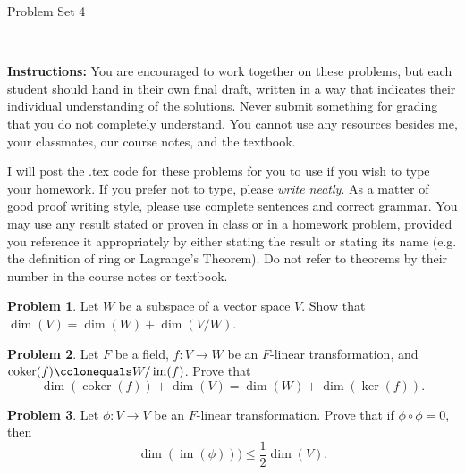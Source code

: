 \documentclass[11pt]{article}
\title{}
\date{\vspace{-0.5in}}
\DeclareMathOperator{\coker}{coker}
\DeclareMathOperator{\im}{im}
\theoremstyle{definition}
\newtheorem{problem}{Problem}
\begin{document}
\thispagestyle{fancy}
\pagestyle{fancy}

\vspace{3em}

\begin{center}
	{\LARGE Problem Set 4}
\end{center}

\

\noindent
{\bf Instructions:}
You are encouraged to work together on these problems, but each student should hand in their own final draft, written in a way that indicates their individual understanding of the solutions. Never submit something for grading that you do not completely understand. You cannot use any resources besides me, your classmates, our course notes, and the textbook.


I will post the .tex code for these problems for you to use if you wish to type your homework. If you prefer not to type, please  {\em write neatly}. As a matter of good proof writing style, please use complete sentences and correct grammar. You may use any result  stated or proven in class or in a homework problem, provided you reference it appropriately by either stating the result or stating its name (e.g. the definition of ring or Lagrange's Theorem). Do not refer to theorems by their number in the course notes or textbook.


\vspace{2em}





\begin{problem}
	Let $W$ be a subspace of a vector space $V$. Show that $\dim(V) = \dim(W) + \dim(V/W)$.
\end{problem}





\begin{problem} 
Let $F$ be a field, $f\!: V \to W$ be an $F$-linear transformation, and $\coker(f) \colonequals W/\im(f)$. Prove that
$$\dim(\coker(f)) + \dim(V) = \dim(W) + \dim(\ker(f)).$$
\end{problem}



\begin{problem}
Let $\phi: V \to V$ be an $F$-linear transformation. Prove that if $\phi \circ \phi  = 0$, then
$$\dim(\im(\phi))) \leqslant \frac{1}{2} \dim(V).$$
\end{problem}
\end{document}
